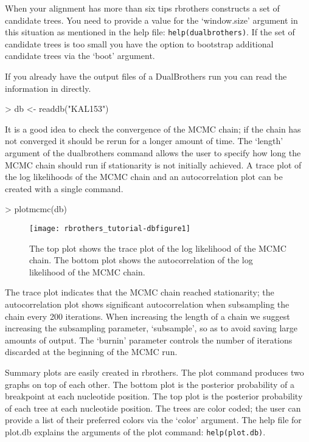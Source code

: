 \documentclass[12pt]{article}
\begin{document}
When your alignment has more than six tips rbrothers constructs a set of candidate trees. You need to provide a value for the `window.size' argument in this situation as mentioned in the help file: \verb|help(dualbrothers)|. If the set of candidate trees is too small you have the option to bootstrap additional candidate trees via the `boot' argument.

If you already have the output files of a DualBrothers run you can read the information in directly.
\begin{Schunk}
\begin{Sinput}
> db <- readdb("KAL153")
\end{Sinput}
\end{Schunk}

It is a good idea to check the convergence of the MCMC chain; if the chain has not converged it should be rerun for a longer amount of time. The `length' argument of the dualbrothers command allows the user to specify how long the MCMC chain should run if stationarity is not initially achieved. A trace plot of the log likelihoods of the MCMC chain and an autocorrelation plot can be created with a single command.
\begin{Schunk}
\begin{Sinput}
> plotmcmc(db)
\end{Sinput}
\end{Schunk}
\begin{figure}[!t]
  \centering
\texttt{[image: rbrothers\_tutorial-dbfigure1]}
\caption{The top plot shows the trace plot of the log likelihood of the MCMC chain. The bottom plot shows the autocorrelation of the log likelihood of the MCMC chain.}
\label{KALmcmcplot}
\end{figure} 
The trace plot indicates that the MCMC chain reached stationarity; the autocorrelation plot shows significant autocorrelation when subsampling the chain every 200 iterations. When increasing the length of a chain we suggest increasing the subsampling parameter, `subsample', so as to avoid saving large amounts of output. The `burnin' parameter controls the number of iterations discarded at the beginning of the MCMC run.


Summary plots are easily created in rbrothers. The plot command produces two graphs on top of each other. The bottom plot is the posterior probability of a breakpoint at each nucleotide position. The top plot is the posterior probability of each tree at each nucleotide position. The trees are color coded; the user can provide a list of their preferred colors via the `color' argument. The help file for plot.db explains the arguments of the plot command: \verb|help(plot.db)|.
\end{document}
